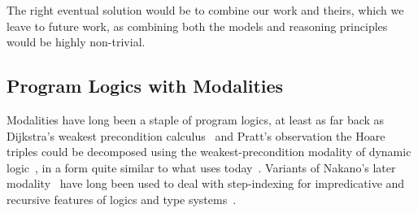 The right eventual solution would be to combine our work
and theirs, which we leave to future work, as combining both the models and reasoning principles would be highly non-trivial.

\subsection{Program Logics with Modalities}
Modalities have long been a staple of program logics, at least as far back as Dijkstra's weakest precondition calculus~\cite{dijkstra1975guarded}
and Pratt's observation the Hoare triples
could be decomposed using the weakest-precondition modality of dynamic logic~\cite{pratt1976semantical},
in a form quite similar to what \iris uses today~\cite{jung2018iris}.
Variants of Nakano's later modality~\cite{nakano2000modality} have long been used to deal with step-indexing 
for impredicative and recursive features of logics and type systems~\cite{Appel2007,hobor2010theory,birkedal2011step,birkedal2013intensional,jung2018iris}.

